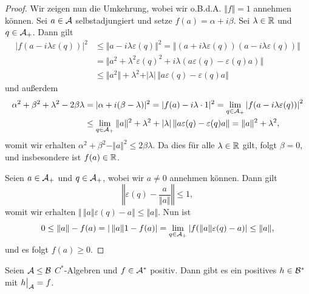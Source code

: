 \begin{proof}
    Wir zeigen nun die Umkehrung, wobei wir o.B.d.A. $\Vert f \Vert = 1$ annehmen können. Sei $a \in \mathcal{A}$ selbstadjungiert und setze $f(a) = \alpha + i \beta$. Sei $\lambda \in \mathbb{R}$ und $q \in \mathcal{A}_+$. Dann gilt
    \begin{align*}
        \vert f(a - i \lambda \varepsilon(q)) \vert^2
        &\leq
        \Vert a - i \lambda \varepsilon(q) \Vert^2
        =
        \Vert (a + i \lambda \varepsilon(q) ) (a - i \lambda \varepsilon(q) ) \Vert
        \\ &=
        \Vert a^2 + \lambda^2 \varepsilon(q)^2 + i \lambda (a \varepsilon(q) - \varepsilon(q) a) \Vert
        \\ &\leq
        \Vert a^2 \Vert + \lambda^2 + \vert \lambda \vert \, \Vert a \varepsilon(q) - \varepsilon(q) a \Vert
    \end{align*}
    und außerdem
    \begin{align*}
        \alpha^2 + \beta^2 + \lambda^2 - 2 \beta \lambda
        &=
        \vert \alpha + i(\beta - \lambda) \vert^2
        =
        \vert f(a) - i \lambda \cdot 1 \vert^2
        =
        \lim_{q \in \mathcal{A}_+} \left\vert f(a - i \lambda \varepsilon(q)) \right\vert^2
        \\ &\leq
        \lim_{q \in \mathcal{A}_+} \Vert a \Vert^2 + \lambda^2 + \vert \lambda \vert \, \Vert a \varepsilon(q) - \varepsilon(q) a \Vert
        =
        \Vert a \Vert^2 + \lambda^2,
    \end{align*}
    womit wir erhalten $\alpha^2 + \beta^2 - \Vert a \Vert^2 \leq 2 \beta \lambda$. Da dies für alle $\lambda \in \mathbb{R}$ gilt, folgt $\beta = 0$, und insbesondere ist $f(a) \in \mathbb{R}$.

    Seien $a \in \mathcal{A}_+$ und $q \in \mathcal{A}_+$, wobei wir $a \neq 0$ annehmen können. Dann gilt
    \[
        \left\Vert \varepsilon(q) - \frac{a}{\Vert a \Vert} \right\Vert \leq 1,
    \]
    womit wir erhalten $\Vert \, \Vert a \Vert \varepsilon(q) - a \Vert \leq \Vert a \Vert$. Nun ist
    \[
        0 \leq \Vert a \Vert - f(a)
        =
        \vert \, \Vert a \Vert 1 - f(a) \vert
        =
        \lim_{q \in \mathcal{A}_+} \vert f(\Vert a \Vert \varepsilon(q) - a) \vert
        \leq
        \Vert a \Vert,
    \]
    und es folgt $f(a) \geq 0$.
\end{proof}

\begin{corollary}
    Seien $\mathcal{A} \leq \mathcal{B}$ $C^*$-Algebren und $f \in \mathcal{A}^*$ positiv. Dann gibt es ein positives $h \in \mathcal{B}^*$ mit $\restr{h}{\Aa} = f$.
\end{corollary}

